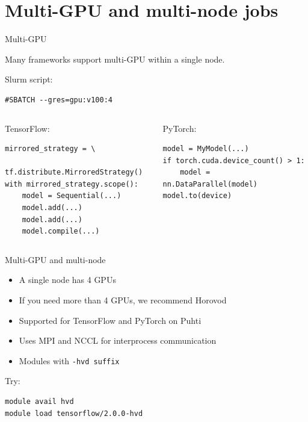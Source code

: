 \documentclass[aspectratio=1610,14pt]{beamer}
\begin{document}
\section{Multi-GPU and multi-node jobs}

\begin{frame}[fragile]{Multi-GPU}

  Many frameworks support multi-GPU within a single node.

  \vspace{0.5em}
  
  Slurm script:
  \begin{verbatim}
#SBATCH --gres=gpu:v100:4
  \end{verbatim}

  \vspace{0.5em}
  
  \begin{columns}[t]
    \begin{column}{0.47\linewidth}
      TensorFlow:
      
      \begin{verbatim}
mirrored_strategy = \
  tf.distribute.MirroredStrategy()
with mirrored_strategy.scope():
    model = Sequential(...)
    model.add(...)
    model.add(...)
    model.compile(...)
      \end{verbatim}
    \end{column}
    \begin{column}{0.47\linewidth}
      PyTorch:
      
      \begin{verbatim}
model = MyModel(...)
if torch.cuda.device_count() > 1:
    model = nn.DataParallel(model)
model.to(device)
      \end{verbatim}
    \end{column}
  \end{columns}
\end{frame}

\begin{frame}[fragile]{Multi-GPU and multi-node}
  \begin{itemize}
  \item A single node has 4 GPUs
  \item If you need more than 4 GPUs, we recommend \alert{Horovod}
  \item Supported for TensorFlow and PyTorch on Puhti
  \item Uses MPI and NCCL for interprocess communication
  \item Modules with {\tt -hvd suffix}
  \end{itemize}

  \vspace{0.7em}

  Try: \vspace{-2mm}
\begin{verbatim}
module avail hvd
module load tensorflow/2.0.0-hvd
\end{verbatim}

\end{frame}  
\end{document}
